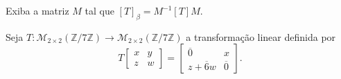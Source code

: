 \begin{questions}
\begin{parts}
		Exiba a matriz $M$ tal que ${\left[T\right]}_{\beta}=M^{-1}\left[T\right]M$.
	\end{parts}

	\begin{solutionordottedlines}
		\begin{parts}
			\part


			\part


			\part

		\end{parts}
	\end{solutionordottedlines}

	\question\label{exercício:2.18}

	Seja
	\begin{math}
		T\colon
		\mathcal{M}_{2\times2}
		\left(\mathbb{Z}/7\mathbb{Z}\right)\to
		\mathcal{M}_{2\times2}
		\left(\mathbb{Z}/7\mathbb{Z}\right)
	\end{math}
	a transformação linear definida por
	\[
		T
		\begin{bmatrix*}
			x & y \\
			z & w
		\end{bmatrix*}
		=
		\begin{bmatrix*}
			\overline{0} & x \\
			z+\overline{6}w & \overline{0}
		\end{bmatrix*}.
	\]

\end{questions}
